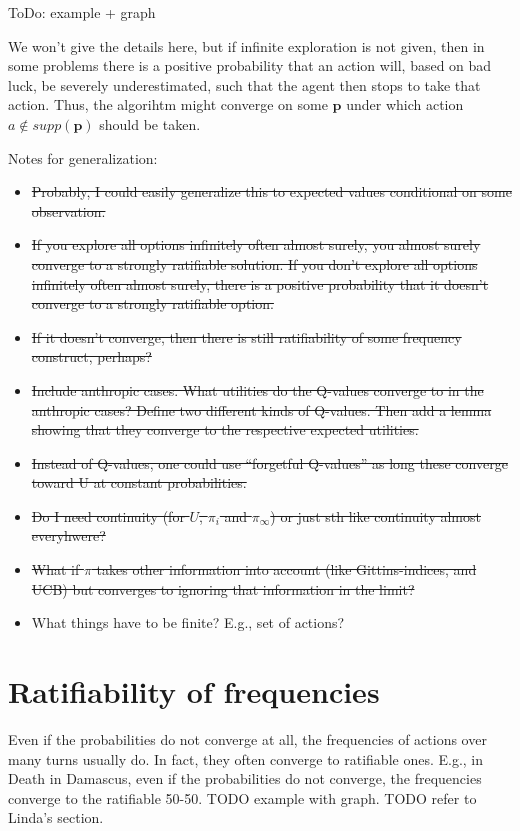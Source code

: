 \documentclass{article}
\begin{document}
ToDo: example + graph

We won't give the details here, but if infinite exploration is not given, then in some problems there is a positive probability that an action will, based on bad luck, be severely underestimated, such that the agent then stops to take that action. Thus, the algorihtm might converge on some $\mathbf{p}$ under which action $a\notin supp(\mathbf{p})$ should be taken.

Notes for generalization:
\begin{itemize}
\item \sout{Probably, I could easily generalize this to expected values conditional on some observation.}
\item \sout{If you explore all options infinitely often almost surely, you almost surely converge to a strongly ratifiable solution. If you don't explore all options infinitely often almost surely, there is a positive probability that it doesn't converge to a strongly ratifiable option.}
\item \sout{If it doesn't converge, then there is still ratifiability of some frequency construct, perhaps?}
\item \sout{Include anthropic cases. What utilities do the Q-values converge to in the anthropic cases? Define two different kinds of Q-values. Then add a lemma showing that they converge to the respective expected utilities.}
\item \sout{Instead of Q-values, one could use ``forgetful Q-values'' as long these converge toward U at constant probabilities.}
\item \sout{Do I need continuity (for $U$, $\pi_i$ and $\pi_\infty$) or just sth like continuity almost everyhwere?}
\item \sout{What if $\pi$ takes other information into account (like Gittins-indices, and UCB) but converges to ignoring that information in the limit?}
\item What things have to be finite? E.g., set of actions?
\end{itemize}

\section*{Ratifiability of frequencies}

Even if the probabilities do not converge at all, the frequencies of actions over many turns usually do. In fact, they often converge to ratifiable ones.  E.g., in Death in Damascus, even if the probabilities do not converge, the frequencies converge to the ratifiable 50-50. TODO example with graph. TODO refer to Linda's section.
\end{document}
